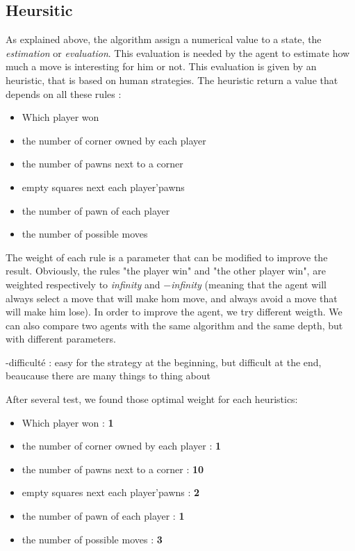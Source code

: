 \documentclass{article}
\begin{document}
\subsection{Heursitic}
As explained above, the algorithm assign a numerical value to a state, the \textit{estimation} or \textit{evaluation}. This evaluation is needed by the agent to estimate how much a move is interesting for him %
or not. This evaluation is given by an heuristic, that is based on human strategies.
The heuristic return a value that depends on all these rules :
\begin{itemize}
    \item Which player won
    \item the number of corner owned by each player
    \item the number of pawns next to a corner
    \item empty squares next each player'pawns
    \item the number of pawn of each player
    \item the number of possible moves
\end{itemize}
The weight of each rule is a parameter that can be modified to improve the result. Obviously, the rules "the player win" and "the other player win", are weighted respectively
to \textit{infinity} and $-$\textit{infinity} (meaning that the agent will always select a move that will make hom move, and always avoid a move that will make him lose).
In order to improve the agent, we try different weigth. We can also compare two agents with the same algorithm and the same depth, but with different parameters.



-difficulté : easy for the strategy at the beginning, but difficult at the end, beaucause there are many things to thing about

 \newline
 After several test, we found those optimal weight for each heuristics:
\begin{itemize}
    \item Which player won : \textbf{1}
    \item the number of corner owned by each player : \textbf{1}
    \item the number of pawns next to a corner : \textbf{10}
    \item empty squares next each player'pawns : \textbf{2}
    \item the number of pawn of each player : \textbf{1}
    \item the number of possible moves : \textbf{3}
\end{itemize}
\end{document}
